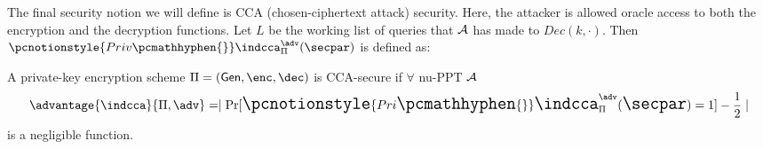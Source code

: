 

\begin{comment}
\begin{definition}[$\pcnotionstyle{Priv\pcmathhyphen{}}\indcpa$] A private-key encryption scheme $\Pi = (\gen,\enc,\dec)$ is $\pcnotionstyle{Priv\pcmathhyphen{}}\indcpa$-secure if 
$$ \advantage{\indcpa}{\Pi,\adv} = \Large\mid \Pr[\pcnotionstyle{Priv\pcmathhyphen{}}\indcpa_\Pi^\adv(\secpar) =1] -\frac12\Large\mid$$
is a negligible function. 
\end{definition}    
The main difference is when the key $k$ is sampled.
In the first definition, $m_0$ and $m_1$ are fixed before $k$ is sampled,
whereas in the second definition, $k$ is sampled before $m_0$ and $m_1$ are fixed.
\end{comment}



The final security notion we will define is CCA (chosen-ciphertext attack) security.
Here, the attacker is allowed oracle access to both the encryption and the decryption functions.
Let $L$ be the working list of queries that $\mathcal{A}$ has made to $Dec(k, \cdot)$.
Then $\pcnotionstyle{Priv\pcmathhyphen{}}\indcca_{\Pi}^{\adv}(\secpar)$ is defined as:

\begin{definition}
    A private-key encryption scheme $\Pi = (\gen,\enc,\dec)$ is CCA-secure if $\forall$ nu-PPT $\mathcal{A}$
    $$\advantage{\indcca}{\Pi,\adv} = \Large\mid \Pr[\pcnotionstyle{Pri\pcmathhyphen{}}\indcca_\Pi^\adv(\secpar) =1] -\frac12\Large\mid$$
    is a negligible function.
\end{definition}

